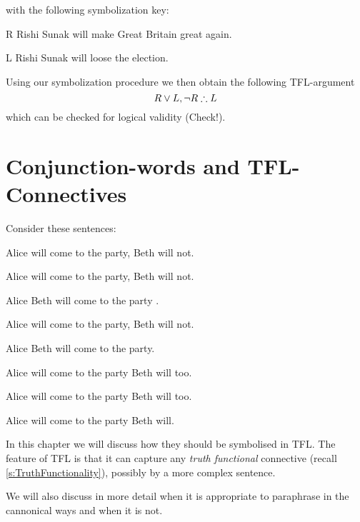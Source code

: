 with the following symbolization key:
\begin{ekey}
	\item[R] Rishi Sunak will make Great Britain great again.
	\item[L] Rishi Sunak will loose the election.
\end{ekey}

Using our symbolization procedure we then obtain the following TFL-argument $$R\eor L,\enot R\therefore L$$ which can be checked for logical validity (Check!).



\chapter{Conjunction-words and TFL-Connectives}\label{sec:symbcon}


Consider these sentences:
\begin{earg}
	\item {} Alice will come to the party, Beth will not.  
	\item Alice will come to the party,  Beth will not.  
	\item {} Alice  Beth will come to the party .  
	\item {} Alice will come to the party, Beth will not.  
	\item {} Alice  Beth will come to the party.  
	\item Alice will come to the party  Beth will too.
	\item Alice will come to the party  Beth will too.
	\item Alice will come to the party  Beth will. 
\end{earg}

In this chapter we will discuss how they should be symbolised in TFL.  The feature of TFL is that it can capture any \emph{truth functional} connective (recall \ref{s:TruthFunctionality}), possibly by a more complex sentence. 

We will also discuss in more detail when it is appropriate to paraphrase in the cannonical ways and when it is not.



